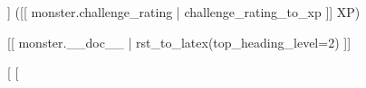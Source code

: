 {    \vspace{0.2cm}

    \begin{description}
    [%
    \item [Senses:] [%
    \item [Languages:] [%
    [%
    [%
    [%
    [%
    [%
    \item [Challenge:] [[ monster.challenge_rating ]] ([[ monster.challenge_rating | challenge_rating_to_xp ]] XP)
    \end{description}

    \vspace{0.2cm}
    
    [[ monster.__doc__ | rst_to_latex(top_heading_level=2) ]]

    } %
  [%
[%
